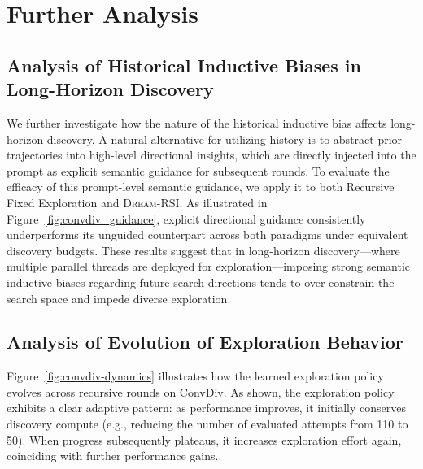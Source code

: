 \section{Further Analysis}
\subsection{Analysis of Historical Inductive Biases in Long-Horizon Discovery}

We further investigate how the nature of the historical inductive bias affects long-horizon discovery. A natural alternative for utilizing history is to abstract prior trajectories into high-level directional insights, which are directly injected into the prompt as explicit semantic guidance for subsequent rounds. To evaluate the efficacy of this prompt-level semantic guidance, we apply it to both Recursive Fixed Exploration and \textsc{Dream-RSI}. As illustrated in Figure~\ref{fig:convdiv_guidance}, explicit directional guidance consistently underperforms its unguided counterpart across both paradigms under equivalent discovery budgets. These results suggest that in long-horizon discovery---where multiple parallel threads are deployed for exploration---imposing strong semantic inductive biases regarding future search directions tends to over-constrain the search space and impede diverse exploration.


\subsection{Analysis of Evolution of Exploration Behavior}

Figure~\ref{fig:convdiv-dynamics} illustrates how the learned exploration policy evolves across recursive rounds on ConvDiv. As shown, the exploration policy exhibits a clear adaptive pattern: as performance improves, it initially conserves discovery compute (e.g., reducing the number of evaluated attempts from 110 to 50). When progress subsequently plateaus, it increases exploration effort again, coinciding with further performance gains..